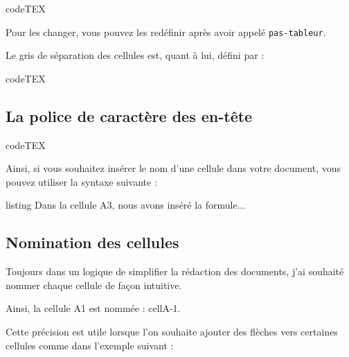 \documentclass[a4paper,french]{article}
\begin{document}
\medskip

\begin{tcblisting}{codeTEX}
\end{tcblisting}

\medskip

Pour les changer, vous pouvez les red\'efinir apr\`es avoir appel\'e \texttt{pas-tableur}.

\medskip

Le gris de s\'eparation des cellules est, quant \`a lui, d\'efini par :

\medskip

\begin{tcblisting}{codeTEX}
\end{tcblisting}

\subsection{La police de caract\`ere des en-t\^ete}

\begin{tcblisting}{codeTEX}
\newcommand{\helvbx}{\usefont{T1}{phv}{m}{n}}
\end{tcblisting}

\medskip

Ainsi, si vous souhaitez ins\'erer le nom d'une cellule dans votre document, vous pouvez utiliser la syntaxe suivante :

\medskip

\begin{tcblisting}{listing}
Dans la cellule {\helvbx A3}, nous 
avons ins\'er\'e la formule...
\end{tcblisting}


\subsection{Nomination des cellules}

Toujours dans un logique de simplifier la r\'edaction des documents, j'ai souhait\'e nommer chaque cellule de fa\c con intuitive.

Ainsi, la cellule {\helvbx A1} est nomm\'ee : cellA-1.

Cette pr\'ecision est utile lorsque l'on souhaite ajouter des fl\`eches vers certaines cellules comme dans l'exemple suivant :

\medskip
\end{document}
